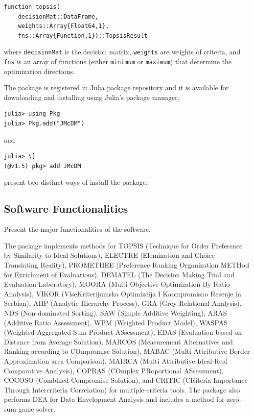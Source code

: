 \documentclass[authoryear,preprint,review,12pt]{elsarticle}
\begin{document}
\begin{verbatim}
function topsis(
    decisionMat::DataFrame, 
    weights::Array{Float64,1}, 
    fns::Array{Function,1})::TopsisResult
\end{verbatim} 

\noindent where \texttt{decisionMat} is the decision matrix, \texttt{weights} are weights of criteria, and \texttt{fns} is an array of functions (either \texttt{minimum} or \texttt{maximum}) that determine the optimization directions. 

The package is registered in Julia package repository and it is available for downloading and installing using Julia's package manager.  

\begin{verbatim}
julia> using Pkg
julia> Pkg.add("JMcDM")
\end{verbatim}

\noindent and 

\begin{verbatim}
julia> \]
(@v1.5) pkg> add JMcDM
\end{verbatim}

\noindent present two distinct ways of install the package.


\subsection{Software Functionalities}
\label{section:softwareFunc}
{\color{red}Present the major functionalities of the software.}

The package implements methods for 
TOPSIS (Technique for Order Preference by Similarity to Ideal Solutions)\cite{topsis}, 
ELECTRE (Elemination and Choice Translating Reality)\cite{topsis}, 
PROMETHEE (Preference Ranking Organization METHod for Enrichment of Evaluations)\cite{topsis}, 
DEMATEL (The Decision Making Trial and Evaluation Laboratory)\cite{topsis}, 
MOORA (Multi-Objective Optimization By Ratio Analysis)\cite{topsis}, 
VIKOR (VlseKriterijumska Optimizcija I Kaompromisno Resenje in Serbian)\cite{topsis}, 
AHP (Analytic Hierarchy Process)\cite{topsis}, 
GRA (Grey Relational Analysis)\cite{topsis}, 
NDS (Non-dominated Sorting)\cite{topsis}, 
SAW (Simple Additive Weighting)\cite{topsis}, 
ARAS (Additive Ratio Assessment)\cite{topsis}, 
WPM (Weighted Product Model)\cite{topsis}, 
WASPAS (Weighted Aggregated Sum Product ASsessment)\cite{topsis}, 
EDAS (Evaluation based on Distance from Average Solution)\cite{topsis}, 
MARCOS (Measurement Alternatives and Ranking according to COmpromise Solution)\cite{topsis}, 
MABAC (Multi-Attributive Border Approximation area Comparison)\cite{topsis}, 
MAIRCA (Multi Attributive Ideal-Real Comparative Analysis)\cite{topsis}, 
COPRAS (COmplex PRoportional ASsessment)\cite{topisis}, 
COCOSO (Combined Compromise Solution)\cite{topsis}, 
and CRITIC (CRiteria Importance Through Intercriteria Correlation)\cite{topsis} for multiple-criteria tools. The package also performs DEA for Data Envelopment Analysis\cite{Citation_Comes_Here} and includes a method for zero-sum game solver.  
\end{document}
